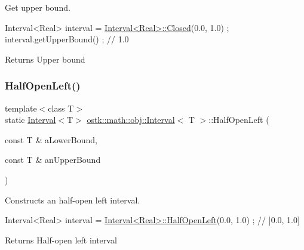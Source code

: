 Get upper bound. 


\begin{DoxyCode}
Interval<Real> interval = \hyperlink{classostk_1_1math_1_1obj_1_1_interval_a48e9f436e8994c49026a1ecd503bc190}{Interval<Real>::Closed}(0.0, 1.0) ;
interval.getUpperBound() ; \textcolor{comment}{// 1.0}
\end{DoxyCode}


\begin{DoxyReturn}{Returns}
Upper bound 
\end{DoxyReturn}
\mbox{\label{classostk_1_1math_1_1obj_1_1_interval_a47bfd73591e68d8c1c7ff1fd626cbf5b}} 
\subsubsection{\texorpdfstring{Half\+Open\+Left()}{HalfOpenLeft()}}
{\footnotesize\ttfamily template$<$class T$>$ \\
static \hyperlink{classostk_1_1math_1_1obj_1_1_interval}{Interval}$<$T$>$ \hyperlink{classostk_1_1math_1_1obj_1_1_interval}{ostk\+::math\+::obj\+::\+Interval}$<$ T $>$\+::Half\+Open\+Left (\begin{DoxyParamCaption}\item[{const T \&}]{a\+Lower\+Bound,  }\item[{const T \&}]{an\+Upper\+Bound }\end{DoxyParamCaption})\hspace{0.3cm}{\ttfamily [static]}}



Constructs an half-\/open left interval. 


\begin{DoxyCode}
Interval<Real> interval = \hyperlink{classostk_1_1math_1_1obj_1_1_interval_a47bfd73591e68d8c1c7ff1fd626cbf5b}{Interval<Real>::HalfOpenLeft}(0.0, 1.0) ; \textcolor{comment}{// ]0.0,
       1.0]}
\end{DoxyCode}


\begin{DoxyReturn}{Returns}
Half-\/open left interval 
\end{DoxyReturn}
\mbox{\label{classostk_1_1math_1_1obj_1_1_interval_abe98617b87988bf157703cbd04bb1905}} 
